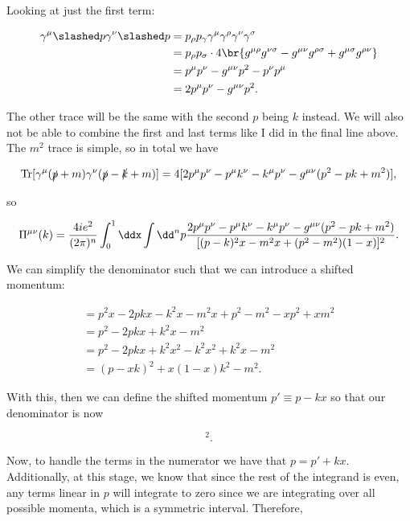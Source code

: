 \documentclass[titlepage]{article}
\begin{document}
Looking at just the first term:

\begin{align}
    \gamma^{\mu}\psl\gamma^{\nu}\psl &= p_{\rho}p_{\gamma}\gamma^{\mu}\gamma^{\rho}\gamma^{\nu}\gamma^{\sigma} \\
    &= p_{\rho}p_{\sigma} \cdot 4\br{g^{\mu\rho}g^{\nu\sigma} - g^{\mu\nu}g^{\rho\sigma} + g^{\mu\sigma}g^{\rho\nu}} \\
    &= p^{\mu}p^{\nu} - g^{\mu\nu}p^2 - p^{\nu}p^{\mu} \\
    &= 2p^{\mu}p^{\nu} - g^{\mu\nu}p^2.
\end{align}

The other trace will be the same with the second $p$ being $k$ instead. We will also not be able to combine the first and last terms like I did in the final line above. The $m^2$ trace is simple, so in total we have

\begin{equation}
    \mathrm{Tr}[\gamma^{\mu}(\slashed{p} + m)\gamma^{\nu}(\slashed{p} - \slashed{k} + m)] = 4[2p^{\mu}p^{\nu} - p^{\mu}k^{\nu} - k^{\mu}p^{\nu} - g^{\mu\nu}(p^2 - pk + m^2)],
\end{equation}

so

\begin{equation}
    \Pi^{\mu\nu}(k) = \frac{4ie^2}{(2\pi)^n} \int_0^1 \ddx \int \dd^np \frac{2p^{\mu}p^{\nu} - p^{\mu}k^{\nu} - k^{\mu}p^{\nu} - g^{\mu\nu}(p^2 - pk + m^2)}{[(p-k)^2x - m^2x + (p^2 - m^2)(1-x)]^2}.
\end{equation}

We can simplify the denominator such that we can introduce a shifted momentum:

\begin{gather}
    = p^2x - 2pkx - k^2x - m^2x + p^2 - m^2 - xp^2 + xm^2 \\
    = p^2 - 2pkx + k^2x - m^2 \\
    = p^2 - 2pkx + k^2x^2 - k^2x^2 + k^2x - m^2 \\
    = (p - xk)^2 + x(1-x)k^2 - m^2.
\end{gather}

With this, then we can define the shifted momentum $p' \equiv p-kx$ so that our denominator is now

\begin{equation}
    [(p')^2 + x(1-x)k^2 - m^2]^2.
\end{equation}

Now, to handle the terms in the numerator we have that $p = p' + kx$. Additionally, at this stage, we know that since the rest of the integrand is even, any terms linear in $p$ will integrate to zero since we are integrating over all possible momenta, which is a symmetric interval. Therefore,
\end{document}
